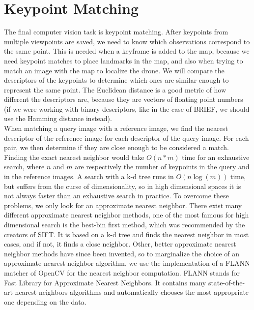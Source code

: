 \section{Keypoint Matching}
The final computer vision task is keypoint matching. After keypoints from multiple viewpoints are saved, we need to know which observations correspond to the same point. This is needed when a keyframe is added to the map, because we need keypoint matches to place landmarks in the map, and also when trying to match an image with the map to localize the drone. We will compare the descriptors of the keypoints to determine which ones are similar enough to represent the same point. The Euclidean distance is a good metric of how different the descriptors are, because they are vectors of floating point numbers (if we were working with binary descriptors, like in the case of BRIEF, we should use the Hamming distance instead).\\
When matching a query image with a reference image, we find the nearest descriptor of the reference image for each descriptor of the query image. For each pair, we then determine if they are close enough to be considered a match. Finding the exact nearest neighbor would take $O(n*m)$ time for an exhaustive search, where $n$ and $m$ are respectively the number of keypoints in the query and in the reference images. A search with a k-d tree runs in $O(n\log(m))$ time, but suffers from the curse of dimensionality, so in high dimensional spaces it is not always faster than an exhaustive search in practice. To overcome these problems, we only look for an approximate nearest neighbor. There exist many different approximate nearest neighbor methods, one of the most famous for high dimensional search is the best-bin first method, which was recommended by the creators of SIFT. It is based on a k-d tree and finds the nearest neighbor in most cases, and if not, it finds a close neighbor. Other, better approximate nearest neighbor methods have since been invented, so to marginalize the choice of an approximate nearest neighbor algorithm, we use the implementation of a FLANN matcher of OpenCV for the nearest neighbor computation. FLANN stands for Fast Library for Approximate Nearest Neighbors. It contains many state-of-the-art nearest neighbors algorithms and automatically chooses the most appropriate one depending on the data.

